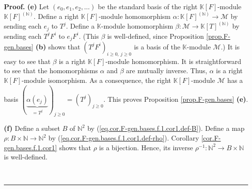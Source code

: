 \documentclass[numbers=enddot,12pt,final,onecolumn,notitlepage]{scrartcl}%
\theoremstyle{definition}
\newenvironment{proof}[1][Proof]{\noindent\textbf{#1.} }{\ \rule{0.5em}{0.5em}}
\begin{document}
\begin{proof}
\textbf{(e)} Let $\left(  e_{0},e_{1},e_{2},\ldots\right)  $ be the standard
basis of the right $\mathbb{K}\left[  F\right]  $-module $\mathbb{K}\left[
F\right]  ^{\left(  \mathbb{N}\right)  }$. Define a right $\mathbb{K}\left[
F\right]  $-module homomorphism $\alpha:\mathbb{K}\left[  F\right]  ^{\left(
\mathbb{N}\right)  }\rightarrow\mathcal{M}$ by sending each $e_{j}$ to $T^{j}%
$. Define a $\mathbb{K}$-module homomorphism $\beta:\mathcal{M}\rightarrow
\mathbb{K}\left[  T\right]  ^{\left(  \mathbb{N}\right)  }$ by sending each
$T^{j}F^{i}$ to $e_{j}F^{i}$. (This $\beta$ is well-defined, since Proposition
\ref{prop.F-gen.bases} \textbf{(b)} shows that $\left(  T^{j}F^{i}\right)
_{i\geq0,\ j\geq0}$ is a basis of the $\mathbb{K}$-module $\mathcal{M}$.) It
is easy to see that $\beta$ is a right $\mathbb{K}\left[  F\right]  $-module
homomorphism. It is straightforward to see that the homomorphisms $\alpha$ and
$\beta$ are mutually inverse. Thus, $\alpha$ is a right $\mathbb{K}\left[
F\right]  $-module isomorphism. As a consequence, the right $\mathbb{K}\left[
F\right]  $-module $\mathcal{M}$ has a basis $\left(  \underbrace{\alpha
\left(  e_{j}\right)  }_{=T^{j}}\right)  _{j\geq0}=\left(  T^{j}\right)
_{j\geq0}$. This proves Proposition \ref{prop.F-gen.bases} \textbf{(e)}.

\textbf{(f)} Define a subset $B$ of $\mathbb{N}^{2}$ by
(\ref{eq.cor.F-gen.bases.f.1.cor1.def-B}). Define a map $\rho:B\times
\mathbb{N}\rightarrow\mathbb{N}^{2}$ by
(\ref{eq.cor.F-gen.bases.f.1.cor1.def-rho}). Corollary
\ref{cor.F-gen.bases.f.1.cor1} shows that $\rho$ is a bijection. Hence, its
inverse $\rho^{-1}:\mathbb{N}^{2}\rightarrow B\times\mathbb{N}$ is well-defined.


\end{proof}
\end{document}
